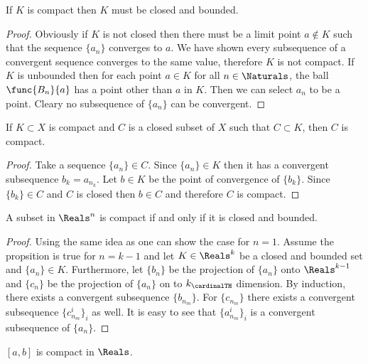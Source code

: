 \begin{corollary}
    If \(K\) is compact then \(K\) must be closed and bounded.
\end{corollary}

\begin{proof}
    Obviously if \(K\) is not closed then there must be a limit point \(a \notin K\) such that the sequence \(\{a_n\}\) converges to \(a\). We have shown every subsequence of a convergent sequence converges to the same value, therefore \(K\) is not compact.
    If \(K\) is unbounded then for each point \(a \in K\) for all \(n \in \Naturals\), the ball \(\func{B_n}{a}\) has a point other than \(a\) in \(K\). Then we can select \(a_n\) to be a point. Cleary no subsequence of \(\{a_n\}\) can be convergent.
\end{proof}

\begin{theorem}
    If \(K \subset X\) is compact and \(C\) is a closed subset of \(X\) such that \(C \subset K\), then \(C\) is compact.
\end{theorem}

\begin{proof}
    Take a sequence \(\{a_n\} \in C\). Since \(\{a_n\} \in K\) then it has a convergent subsequence \(b_k = a_{n_k}\). Let \(b \in K\) be the point of convergence of \(\{b_k\}\). Since \(\{b_k\} \in C\) and \(C\) is closed then \(b \in C\) and therefore \(C\) is compact.
\end{proof}

\begin{proposition}
    A subset in \(\Reals^n\) is compact if and only if it is closed and bounded.
\end{proposition}

\begin{proof}
    Using the same idea as  one can show the case for \(n = 1\). Assume the propsition is true for \(n = k - 1\) and let \(K \in \Reals^k\) be a closed and bounded set and \(\{a_n\} \in K\). Furthermore, let \(\{b_n\}\) be the projection of \(\{a_n\}\) onto \(\Reals^{k-1}\) and \(\{c_n\}\) be the projection of \(\{a_n\}\) on to \(k_{\cardinalTH}\) dimension. By induction, there exists a convergent subsequence \(\{b_{n_m}\}\). For \(\{c_{n_m}\}\) there exists a convergent subsequence \(\{c_{n_m}^i\}_i\) as well. It is easy to see that \(\{ a_{n_m}^i\}_i \) is a convergent subsequence of \(\{a_n\}\).
\end{proof}

\begin{corollary}
    \([a,b]\) is compact in \(\Reals\).
\end{corollary}

